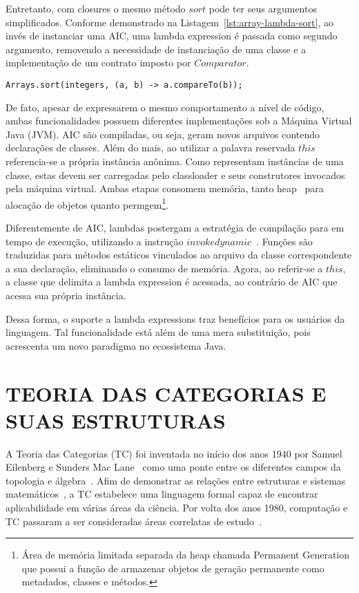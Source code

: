 \documentclass[10pt, conference]{IEEEtran}
\begin{document}
Entretanto, com closures o mesmo método $sort$ pode ter seus argumentos simplificados. Conforme demonstrado na Listagem~\ref{lst:array-lambda-sort}, ao invés de instanciar uma AIC, uma lambda expression é passada como segundo argumento, removendo a necessidade de instanciação de uma classe e a implementação de um contrato imposto por $Comparator$.

\begin{lstlisting}[caption={Sort - Lambda Expression}, label={lst:array-lambda-sort}]
Arrays.sort(integers, (a, b) -> a.compareTo(b));
\end{lstlisting}

De fato, apesar de expressarem o mesmo comportamento a nível de código, ambas funcionalidades possuem diferentes implementações sob a Máquina Virtual Java (JVM). AIC são compiladas, ou seja, geram novos arquivos contendo declarações de classes. Além do mais, ao utilizar a palavra reservada $this$ referencia-se a própria instância anônima. Como representam instâncias de uma classe, estas devem ser carregadas pelo classloader e seus construtores invocados pela máquina virtual. Ambas etapas consomem memória, tanto heap~\cite{hunt2011java} para alocação de objetos quanto permgem\footnote{Área de memória limitada separada da heap chamada Permanent Generation que possui a função de armazenar objetos de geração permanente como metadados, classes e métodos.}.

Diferentemente de AIC, lambdas postergam a estratégia de compilação para em tempo de execução, utilizando a instrução $invokedynamic$~\cite{goetz2012translation}. Funções são traduzidas para métodos estáticos vinculados ao arquivo da classe correspondente a sua declaração, eliminando o consumo de memória. Agora, ao referir-se a $this$, a classe que delimita a lambda expression é acessada, ao contrário de AIC que acessa sua própria instância.

Dessa forma, o suporte a lambda expressions traz benefícios para os usuários da linguagem. Tal funcionalidade está além de uma mera substituição, pois acrescenta um novo paradigma no ecossistema Java.

\section{TEORIA DAS CATEGORIAS E SUAS ESTRUTURAS}
A Teoria das Categorias (TC) foi inventada no início dos anos 1940 por Samuel Eilenberg e Sunders Mac Lane~\cite{eilenbergmaclane1945naturalequivalences} como uma ponte entre os diferentes campos da topologia e álgebra~\cite{spivak2014cts}. Afim de demonstrar as relações entre estruturas e sistemas matemáticos~\cite{maclane1971mat}, a TC estabelece uma linguagem formal capaz de encontrar aplicabilidade em várias áreas da ciência. Por volta dos anos 1980, computação e TC passaram a ser consideradas áreas correlatas de estudo~\cite{carlos2006caracteristicas}.
\end{document}
